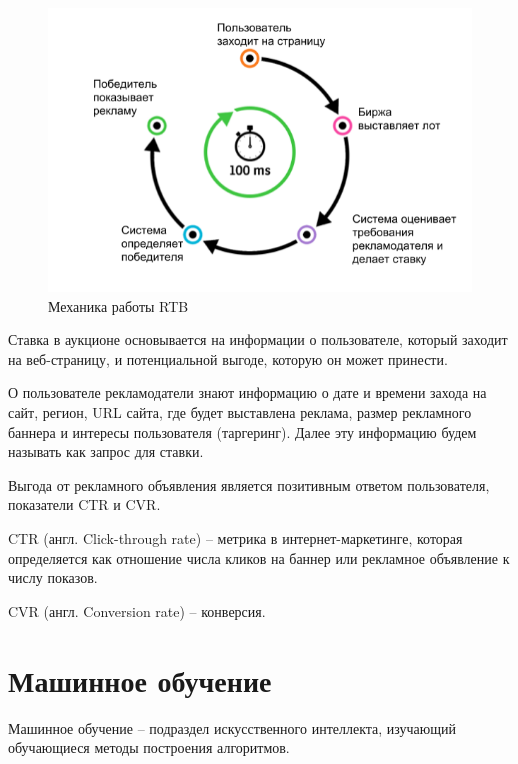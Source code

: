 \documentclass[times,specification,annotation]{itmo-student-thesis}
\begin{document}
\begin{figure}[h]\label{fig:rtb}
    \caption{Механика работы RTB}
    \centering
    \includegraphics{rtb-example.png}
\end{figure}

Ставка в аукционе основывается на информации о пользователе, 
который заходит на веб-страницу, 
и потенциальной выгоде, которую он может принести.

О пользователе рекламодатели знают информацию 
о дате и времени захода на сайт, регион, URL сайта, где будет выставлена реклама, 
размер рекламного баннера и интересы пользователя (таргеринг). 
Далее эту информацию будем называть как запрос для ставки.

Выгода от рекламного объявления является позитивным ответом пользователя, показатели CTR и CVR.

\begin{definition}
    CTR (англ. Click-through rate) – метрика в интернет-маркетинге, 
    которая определяется как отношение числа кликов на баннер или рекламное объявление к числу показов.
\end{definition}

\begin{definition}
    CVR (англ. Conversion rate) – конверсия.
\end{definition}


\section{Машинное обучение}

\begin{definition}
    Машинное обучение – подраздел искусственного интеллекта, изучающий обучающиеся методы построения алгоритмов.
\end{definition}
\end{document}

